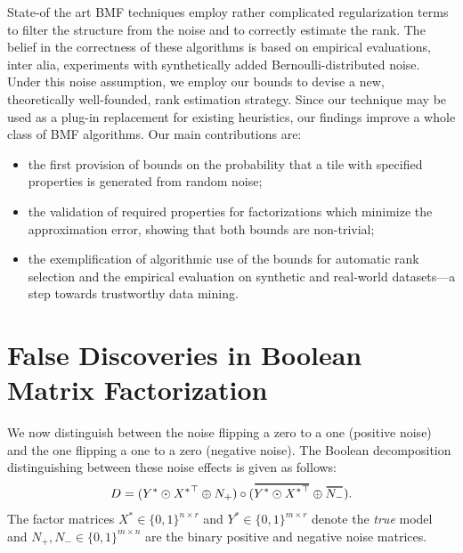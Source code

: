 State-of the art BMF techniques employ rather complicated regularization terms to filter the structure from the noise and to correctly estimate the rank. The belief in the correctness of these algorithms is based on empirical evaluations, inter alia, experiments with synthetically added Bernoulli-distributed noise. 
Under this noise assumption, we employ our bounds to devise a new, theoretically well-founded, rank estimation strategy. Since our technique may be used as a plug-in replacement for existing heuristics, our findings improve a whole class of BMF algorithms.
Our main contributions are:
\begin{itemize}
\item the first provision of bounds on the probability that a tile with specified properties is generated from random noise;
\item the validation of required properties for factorizations which minimize the approximation error, showing that both bounds are non-trivial;
\item the exemplification of algorithmic use of the bounds for automatic rank selection and the empirical evaluation on synthetic and real-world datasets---a step towards trustworthy data mining. 
\end{itemize}
\section{False Discoveries in Boolean Matrix Factorization}\label{sec:TP:boundingFDR}
We now distinguish between the noise flipping a zero to a one (positive noise) and the one flipping a one to a zero (negative noise). The Boolean decomposition distinguishing between these noise effects is given as follows:
\begin{align}\label{eq:BMF0}
D=(Y^*\odot {X^*}^\top \oplus N_+) \circ (\thickbar{Y^*\odot {X^*}^\top} \oplus \thickbar{N_-}).
\end{align}
The factor matrices $X^*\in\{0,1\}^{n\times r}$ and $Y^*\in\{0,1\}^{m\times r}$ denote the \emph{true} model and $N_+,N_-\in\{0,1\}^{m\times n}$ are the binary positive and negative noise matrices. 

